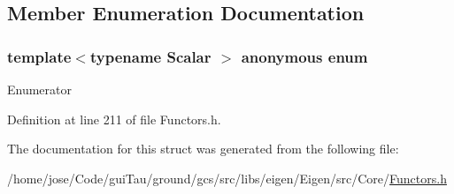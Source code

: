 \subsection{Member Enumeration Documentation}
\hypertarget{structei__functor__traits_3_01ei__scalar__conjugate__op_3_01_scalar_01_4_01_4_adf91d1217dfb0d22044b7c2dc3d06d3e}{\subsubsection[{anonymous enum}]{\setlength{\rightskip}{0pt plus 5cm}template$<$typename Scalar $>$ anonymous enum}}\label{structei__functor__traits_3_01ei__scalar__conjugate__op_3_01_scalar_01_4_01_4_adf91d1217dfb0d22044b7c2dc3d06d3e}
\begin{Desc}
\item[Enumerator]\par
\begin{description}
\item[{\em 
\hypertarget{structei__functor__traits_3_01ei__scalar__conjugate__op_3_01_scalar_01_4_01_4_adf91d1217dfb0d22044b7c2dc3d06d3ea8fa3137e29062cdee3791056deb6fa4d}{Cost}\label{structei__functor__traits_3_01ei__scalar__conjugate__op_3_01_scalar_01_4_01_4_adf91d1217dfb0d22044b7c2dc3d06d3ea8fa3137e29062cdee3791056deb6fa4d}
}]\end{description}
\end{Desc}


Definition at line 211 of file Functors.\-h.



The documentation for this struct was generated from the following file\-:\begin{DoxyCompactItemize}
\item 
/home/jose/\-Code/gui\-Tau/ground/gcs/src/libs/eigen/\-Eigen/src/\-Core/\hyperlink{_core_2_functors_8h}{Functors.\-h}\end{DoxyCompactItemize}
